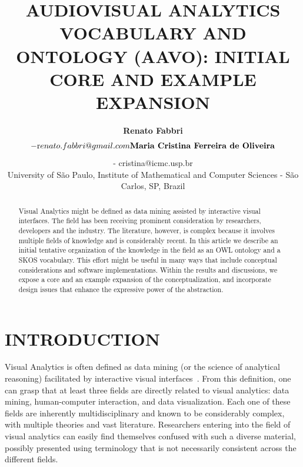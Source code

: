 \documentclass[12pt,fleqn]{article}
\title{AUDIOVISUAL ANALYTICS VOCABULARY AND ONTOLOGY (AAVO): INITIAL CORE AND EXAMPLE EXPANSION}
\author
    {\rm \begin{tabular}{l} 
    \textbf{Renato Fabbri}$$ - {\textnormal renato.fabbri@gmail.com}\\%
    \textbf{Maria Cristina Ferreira de Oliveira}$$ - {\textnormal cristina@icmc.usp.br}\\
    {\fontsize{11}{0}\selectfont University of São Paulo, Institute of Mathematical and Computer Sciences - São Carlos, SP, Brazil}\vspace*{-0.05cm} \\
  \end{tabular}}
\renewcommand{\headrulewidth}{0.0pt}
\begin{document}
\maketitle

\thispagestyle{firspagetstyle}

\renewcommand{\headrulewidth}{0.0pt}
\rhead{}

\begin{abstract}
Visual Analytics might be defined as data mining assisted by interactive visual interfaces.
The field has been receiving prominent consideration by researchers, developers and the industry. 
The literature, however, is complex because it involves multiple fields of knowledge
and is considerably recent.
In this article we describe an initial tentative organization of the knowledge in the field as an OWL ontology
and a SKOS vocabulary.
This effort might be useful in many ways that include conceptual considerations and
software implementations.
Within the results and discussions, we expose a core and an example expansion
of the conceptualization, and incorporate design issues that enhance the
expressive power of the abstraction. 
\end{abstract}


\pagestyle{fancy}

\section{INTRODUCTION}\label{sec:intro}
Visual Analytics is often defined as data mining (or the science of analytical reasoning)  facilitated by interactive visual interfaces~\citep{wikiVA,visMaster}.
% 
% 
% 
% 
%
From this definition, one can grasp that at least three fields are directly related to visual analytics:
data mining, human-computer interaction, and data visualization.
Each one of these fields are inherently multidisciplinary and known to be considerably complex,
with multiple theories and vast literature. Researchers entering into the field of visual analytics can easily find themselves confused with such a diverse material, possibly presented using  terminology that is not necessarily consistent across the different fields.   
\end{document}
